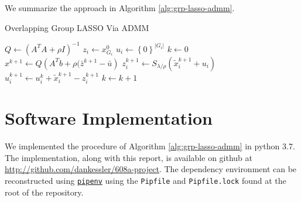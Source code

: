 \documentclass{article}
\begin{document}
We summarize the approach in Algorithm \ref{alg:grp-lasso-admm}.
\begin{algorithm}
    \caption{Overlapping Group LASSO Via ADMM}
    \label{alg:grp-lasso-admm}
    \begin{algorithmic}[1]
      \State $Q \gets (A^TA + \rho I)^{-1}$
      \State $z_i \gets x^0_{G_i}$
      \State $u_i \gets \left\{ 0 \right\}^{\lvert G_i \rvert}$
      \EndFor
      \State $k \gets 0$ 
      \State $x^{k+1} \gets Q \left( A^Tb + \rho(\bar{z}^{k+1} - \bar{u} \right)$
      \State $z_i^{k+1} \gets S_{\lambda/\rho}(\tilde{x}_i^{k+1} + u_i)$
      \EndFor
      \State $u_i^{k+1} \gets u_i^k + \tilde{x}_i^{k+1} - z_i^{k+1} $
      \EndFor      
      \State $k \gets k+1$
      \EndWhile
  \end{algorithmic}
\end{algorithm}

\section{Software Implementation}
\label{sec:implementation}
We implemented the procedure of Algorithm \ref{alg:grp-lasso-admm} in python 3.7.
The implementation, along with this report, is available on github at \url{http://github.com/dankessler/608a-project}.
The dependency environment can be reconstructed using \href{https://pipenv.readthedocs.io/en/latest/}{\texttt{pipenv}} using the \texttt{Pipfile} and \texttt{Pipfile.lock} found at the root of the repository.
\end{document}
